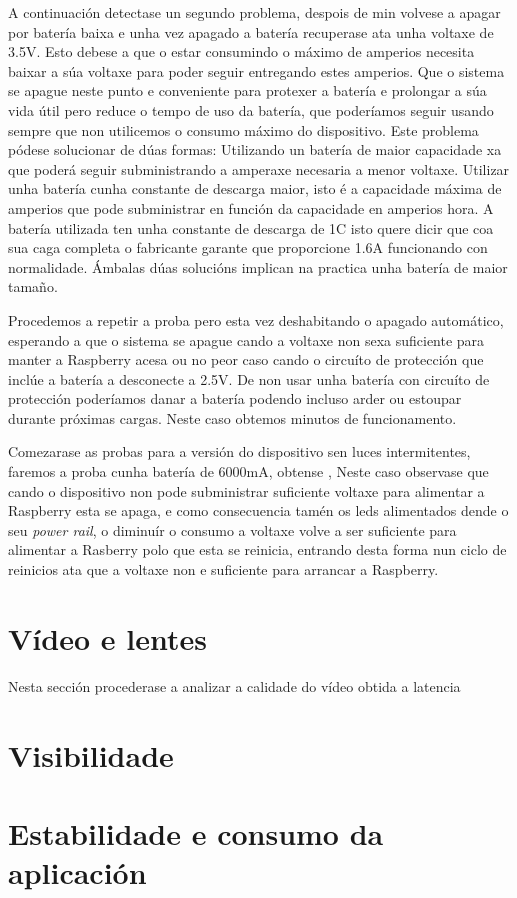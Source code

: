 A continuación detectase un segundo problema, despois de  min volvese a apagar por batería baixa e unha vez apagado a batería recuperase ata unha voltaxe de 3.5V. Esto debese a que o estar consumindo o máximo de amperios necesita baixar a súa voltaxe para poder seguir entregando estes amperios. Que o sistema se apague neste punto e conveniente para protexer a batería e prolongar a súa vida útil pero reduce o tempo de uso da batería, que poderíamos seguir usando sempre que non utilicemos o consumo máximo do dispositivo. Este problema pódese solucionar de dúas formas:
Utilizando un batería de maior capacidade xa que poderá seguir subministrando a amperaxe necesaria a menor voltaxe.
Utilizar unha batería cunha constante de descarga maior, isto é a capacidade máxima de amperios que pode subministrar en función da capacidade en amperios hora. A batería utilizada ten unha constante de descarga de 1C isto quere dicir que coa sua caga completa o fabricante garante que proporcione 1.6A funcionando con normalidade.
Ámbalas dúas solucións implican na practica unha batería de maior tamaño.

Procedemos a repetir a proba pero esta vez deshabitando o apagado automático, esperando a que o sistema se apague cando a voltaxe non sexa suficiente para manter a Raspberry acesa ou no peor caso cando o circuíto de protección que inclúe a batería a desconecte a 2.5V. De non usar unha batería con circuíto de protección poderíamos danar a batería podendo incluso arder ou estoupar durante próximas cargas. Neste caso obtemos minutos de funcionamento.

Comezarase as probas para a versión do dispositivo sen luces intermitentes, faremos a proba cunha batería de 6000mA, obtense    , Neste caso observase que cando o dispositivo non pode subministrar suficiente voltaxe para alimentar a Raspberry esta se apaga, e como consecuencia tamén os leds alimentados dende o seu \emph{power rail}, o diminuír o consumo a voltaxe volve a ser suficiente para alimentar a Rasberry polo que esta se reinicia, entrando desta forma nun ciclo de reinicios ata que a voltaxe non e suficiente para arrancar a Raspberry.

\section{Vídeo e lentes}
Nesta sección procederase a analizar a calidade do vídeo obtida a latencia
\section{Visibilidade}

\section{Estabilidade e consumo da aplicación}
